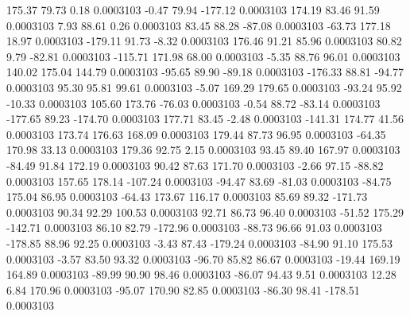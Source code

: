       175.37       79.73        0.18     0.0003103
       -0.47       79.94     -177.12     0.0003103
      174.19       83.46       91.59     0.0003103
        7.93       88.61        0.26     0.0003103
       83.45       88.28      -87.08     0.0003103
      -63.73      177.18       18.97     0.0003103
     -179.11       91.73       -8.32     0.0003103
      176.46       91.21       85.96     0.0003103
       80.82        9.79      -82.81     0.0003103
     -115.71      171.98       68.00     0.0003103
       -5.35       88.76       96.01     0.0003103
      140.02      175.04      144.79     0.0003103
      -95.65       89.90      -89.18     0.0003103
     -176.33       88.81      -94.77     0.0003103
       95.30       95.81       99.61     0.0003103
       -5.07      169.29      179.65     0.0003103
      -93.24       95.92      -10.33     0.0003103
      105.60      173.76      -76.03     0.0003103
       -0.54       88.72      -83.14     0.0003103
     -177.65       89.23     -174.70     0.0003103
      177.71       83.45       -2.48     0.0003103
     -141.31      174.77       41.56     0.0003103
      173.74      176.63      168.09     0.0003103
      179.44       87.73       96.95     0.0003103
      -64.35      170.98       33.13     0.0003103
      179.36       92.75        2.15     0.0003103
       93.45       89.40      167.97     0.0003103
      -84.49       91.84      172.19     0.0003103
       90.42       87.63      171.70     0.0003103
       -2.66       97.15      -88.82     0.0003103
      157.65      178.14     -107.24     0.0003103
      -94.47       83.69      -81.03     0.0003103
      -84.75      175.04       86.95     0.0003103
      -64.43      173.67      116.17     0.0003103
       85.69       89.32     -171.73     0.0003103
       90.34       92.29      100.53     0.0003103
       92.71       86.73       96.40     0.0003103
      -51.52      175.29     -142.71     0.0003103
       86.10       82.79     -172.96     0.0003103
      -88.73       96.66       91.03     0.0003103
     -178.85       88.96       92.25     0.0003103
       -3.43       87.43     -179.24     0.0003103
      -84.90       91.10      175.53     0.0003103
       -3.57       83.50       93.32     0.0003103
      -96.70       85.82       86.67     0.0003103
      -19.44      169.19      164.89     0.0003103
      -89.99       90.90       98.46     0.0003103
      -86.07       94.43        9.51     0.0003103
       12.28        6.84      170.96     0.0003103
      -95.07      170.90       82.85     0.0003103
      -86.30       98.41     -178.51     0.0003103
